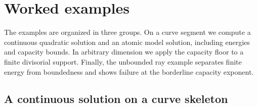 \section{Worked examples}
\label{sec:ch29-worked}

The examples are organized in three groups.  On a curve segment we
compute a continuous quadratic solution and an atomic model solution,
including energies and capacity bounds.  In arbitrary dimension we apply
the capacity floor to a finite divisorial support.  Finally, the unbounded
ray example separates finite energy from boundedness and shows failure at
the borderline capacity exponent.

\subsection{A continuous solution on a curve skeleton}
\label{sec:ch29-ex-curve}

